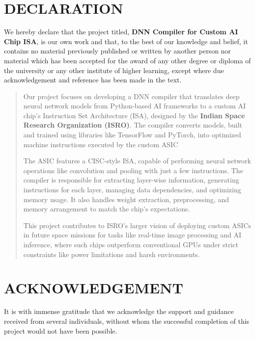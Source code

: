 \documentclass[12pt]{report}
\begin{document}
\begin{spacing}{1.01}
{{\begin{tabular}{p{4.8cm}cp{4.5cm}}
\end{tabular}
}
}
\chapter*{DECLARATION}
We hereby declare that the project titled, \textbf{DNN Compiler for Custom AI Chip ISA}, is our own work and that, to the best of our knowledge and belief, it contains no material previously published or written by another person nor material which has been accepted for the award of any other degree or diploma of the university or any other institute of higher learning, except where due acknowledgement and reference has been made in the text.\\

\vspace{2cm}
\newpage 

\begin{abstract}
Our project focuses on developing a DNN compiler that translates deep neural network models from Python-based AI frameworks to a custom AI chip’s Instruction Set Architecture (ISA), designed by the \textbf{Indian Space Research Organization (ISRO)}. The compiler converts models, built and trained using libraries like TensorFlow and PyTorch, into optimized machine instructions executed by the custom ASIC

The ASIC features a CISC-style ISA, capable of performing neural network operations like convolution and pooling with just a few instructions. The compiler is responsible for extracting layer-wise information, generating instructions for each layer, managing data dependencies, and optimizing memory usage. It also handles weight extraction, preprocessing, and memory arrangement to match the chip’s expectations.

This project contributes to ISRO’s larger vision of deploying custom ASICs in future space missions for tasks like real-time image processing and AI inference, where such chips outperform conventional GPUs under strict constraints like power limitations and harsh environments.

\end{abstract}
\chapter*{\rm \large \bf ACKNOWLEDGEMENT}
It is with immense gratitude that we acknowledge the support and guidance received from several individuals, without whom the successful completion of this project would not have been possible.


\end{spacing}
\end{document}
